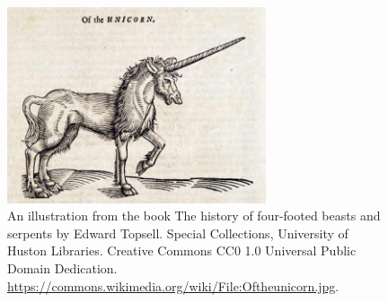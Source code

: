 \documentclass[12pt]{extarticle}
\begin{document}
\begin{figure}[b!]
\begin{center}
\includegraphics[width=3.0in]{Oftheunicorn.jpg}
\vspace{1mm}
\caption{An illustration from the book The history of four-footed
  beasts and serpents by Edward Topsell. Special Collections,
  University of Huston Libraries. Creative Commons CC0 1.0 Universal
  Public Domain Dedication. \href{https://commons.wikimedia.org/wiki/File:Oftheunicorn.jpg}{https://commons.wikimedia.org/wiki/File:Oftheunicorn.jpg}.}
\end{center}
\end{figure}
\end{document}
